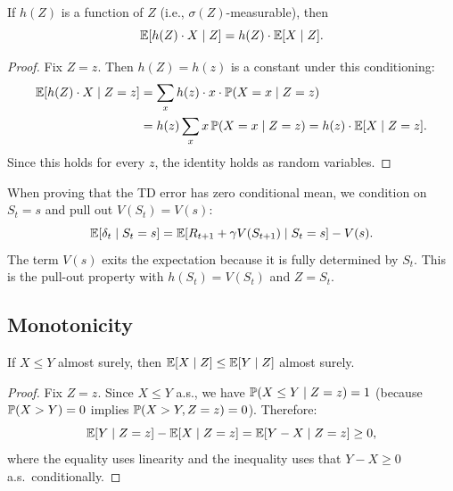 \documentclass[11pt,a4paper]{article}
\begin{document}
\begin{keyresult}[title={Pull-Out Property}]
\begin{theorem}
\label{thm:pull_out}
If $h(Z)$ is a function of $Z$ (i.e., $\sigma(Z)$-measurable),
then
\begin{equation}
  \mathbb{E}[h(Z) \cdot X \mid Z] = h(Z) \cdot \mathbb{E}[X \mid Z].
  \label{eq:pull_out}
\end{equation}
\end{theorem}
\end{keyresult}

\begin{proof}
Fix $Z = z$.  Then $h(Z) = h(z)$ is a constant under this
conditioning:
\begin{align}
  \mathbb{E}[h(Z) \cdot X \mid Z = z]
  &= \sum_x h(z) \cdot x \cdot \mathbb{P}(X = x \mid Z = z)
  \nonumber\\
  &= h(z) \sum_x x\, \mathbb{P}(X = x \mid Z = z)
  = h(z) \cdot \mathbb{E}[X \mid Z = z].
  \label{eq:pull_out_proof}
\end{align}
Since this holds for every $z$, the identity holds as random
variables.
\end{proof}

\begin{rlconnection}[title={Connection to RL}]
When proving that the TD error has zero conditional mean, we
condition on $S_t = s$ and pull out $V(S_t) = V(s)$:
\[
  \mathbb{E}[\delta_t \mid S_t = s]
  = \mathbb{E}[R_{t+1} + \gamma V(S_{t+1}) \mid S_t = s] - V(s).
\]
The term $V(s)$ exits the expectation because it is fully
determined by $S_t$.  This is the pull-out property with
$h(S_t) = V(S_t)$ and $Z = S_t$.
\end{rlconnection}

\subsection{Monotonicity}
\label{subsec:monotonicity}

\begin{proposition}
\label{prop:cond_mono}
If $X \leq Y$ almost surely, then
$\mathbb{E}[X \mid Z] \leq \mathbb{E}[Y \mid Z]$ almost surely.
\end{proposition}

\begin{proof}
Fix $Z = z$.  Since $X \leq Y$ a.s., we have
$\mathbb{P}(X \leq Y \mid Z = z) = 1$ (because
$\mathbb{P}(X > Y) = 0$ implies $\mathbb{P}(X > Y, Z = z) = 0$).
Therefore:
\begin{equation}
  \mathbb{E}[Y \mid Z = z] - \mathbb{E}[X \mid Z = z]
  = \mathbb{E}[Y - X \mid Z = z] \geq 0,
\end{equation}
where the equality uses linearity and the inequality uses that
$Y - X \geq 0$ a.s.\ conditionally.
\end{proof}
\end{document}
